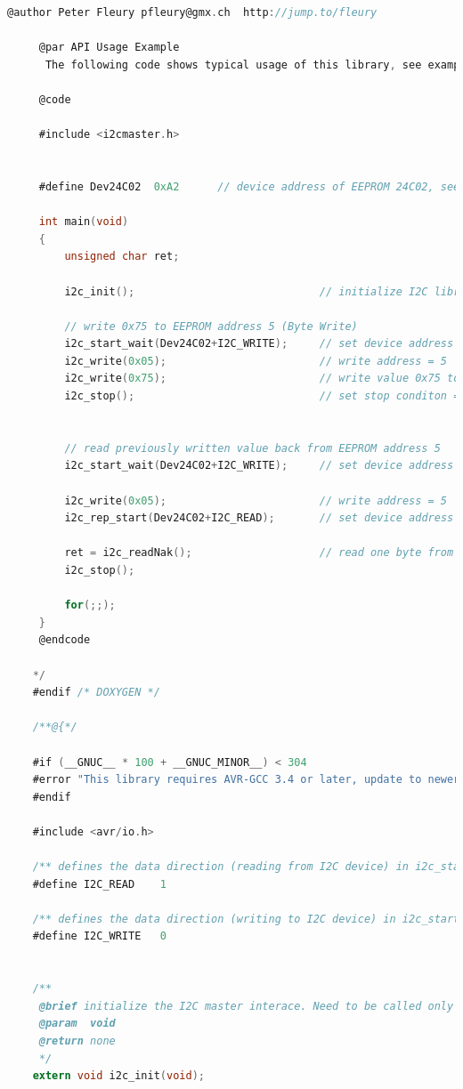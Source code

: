 \documentclass{article}
\numberwithin{figure}{section}
\numberwithin{equation}{section}
\begin{document}
{\begin{lstlisting}[language=C,label=lst:i2cmaster.h,caption=i2cmaster.h]
     @author Peter Fleury pfleury@gmx.ch  http://jump.to/fleury

     @par API Usage Example
      The following code shows typical usage of this library, see example test_i2cmaster.c

     @code

     #include <i2cmaster.h>


     #define Dev24C02  0xA2      // device address of EEPROM 24C02, see datasheet

     int main(void)
     {
         unsigned char ret;

         i2c_init();                             // initialize I2C library

         // write 0x75 to EEPROM address 5 (Byte Write)
         i2c_start_wait(Dev24C02+I2C_WRITE);     // set device address and write mode
         i2c_write(0x05);                        // write address = 5
         i2c_write(0x75);                        // write value 0x75 to EEPROM
         i2c_stop();                             // set stop conditon = release bus


         // read previously written value back from EEPROM address 5
         i2c_start_wait(Dev24C02+I2C_WRITE);     // set device address and write mode

         i2c_write(0x05);                        // write address = 5
         i2c_rep_start(Dev24C02+I2C_READ);       // set device address and read mode

         ret = i2c_readNak();                    // read one byte from EEPROM
         i2c_stop();

         for(;;);
     }
     @endcode

    */
    #endif /* DOXYGEN */

    /**@{*/

    #if (__GNUC__ * 100 + __GNUC_MINOR__) < 304
    #error "This library requires AVR-GCC 3.4 or later, update to newer AVR-GCC compiler !"
    #endif

    #include <avr/io.h>

    /** defines the data direction (reading from I2C device) in i2c_start(),i2c_rep_start() */
    #define I2C_READ    1

    /** defines the data direction (writing to I2C device) in i2c_start(),i2c_rep_start() */
    #define I2C_WRITE   0


    /**
     @brief initialize the I2C master interace. Need to be called only once
     @param  void
     @return none
     */
    extern void i2c_init(void);



\end{lstlisting}}
\end{document}
